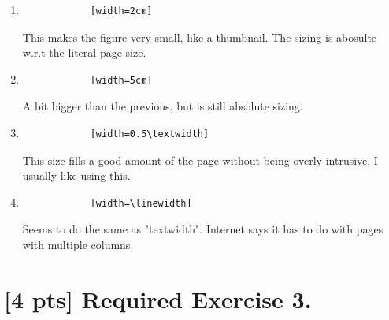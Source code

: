\documentclass{article}
\begin{document}
\begin{enumerate}
    \item {
        \begin{verbatim}
            [width=2cm]
        \end{verbatim}

        This makes the figure very small, like a thumbnail. The
        sizing is abosulte w.r.t the literal page size.
    }
    \item {
        \begin{verbatim}
            [width=5cm]
        \end{verbatim}
        
        A bit bigger than the previous, but is still absolute sizing.
    }
    \item {
        \begin{verbatim}
            [width=0.5\textwidth]
        \end{verbatim}

        This size fills a good amount of the page without being overly 
        intrusive. I usually like using this.
    }

    \item {
        \begin{verbatim}
            [width=\linewidth]
        \end{verbatim}

        Seems to do the same as "textwidth". Internet says it has to do with 
        pages with multiple columns.
    }
\end{enumerate}

\section*{[4 pts] Required Exercise 3.}
\end{document}
